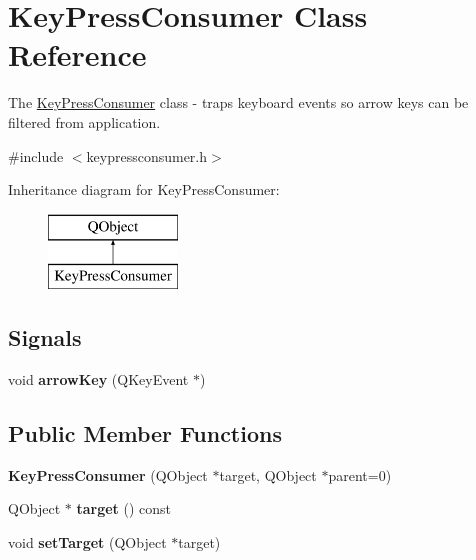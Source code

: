 \hypertarget{class_key_press_consumer}{}\section{Key\+Press\+Consumer Class Reference}
\label{class_key_press_consumer}


The \hyperlink{class_key_press_consumer}{Key\+Press\+Consumer} class -\/ traps keyboard events so arrow keys can be filtered from application.  




{\ttfamily \#include $<$keypressconsumer.\+h$>$}

Inheritance diagram for Key\+Press\+Consumer\+:\begin{figure}[H]
\begin{center}
\leavevmode
\includegraphics[height=2.000000cm]{class_key_press_consumer}
\end{center}
\end{figure}
\subsection*{Signals}
\begin{DoxyCompactItemize}
\item 
\mbox{\label{class_key_press_consumer_aba09e00816c6024836487d2cb6249cd8}} 
void {\bfseries arrow\+Key} (Q\+Key\+Event $\ast$)
\end{DoxyCompactItemize}
\subsection*{Public Member Functions}
\begin{DoxyCompactItemize}
\item 
\mbox{\label{class_key_press_consumer_a6f51041d96314790d033bce351b8f020}} 
{\bfseries Key\+Press\+Consumer} (Q\+Object $\ast$target, Q\+Object $\ast$parent=0)
\item 
\mbox{\label{class_key_press_consumer_a2cbcc1db29e0447999a58f658cbae742}} 
Q\+Object $\ast$ {\bfseries target} () const
\item 
\mbox{\label{class_key_press_consumer_abcbcaf5a0c8e1d04b134e6b65b53ad7e}} 
void {\bfseries set\+Target} (Q\+Object $\ast$target)
\end{DoxyCompactItemize}
